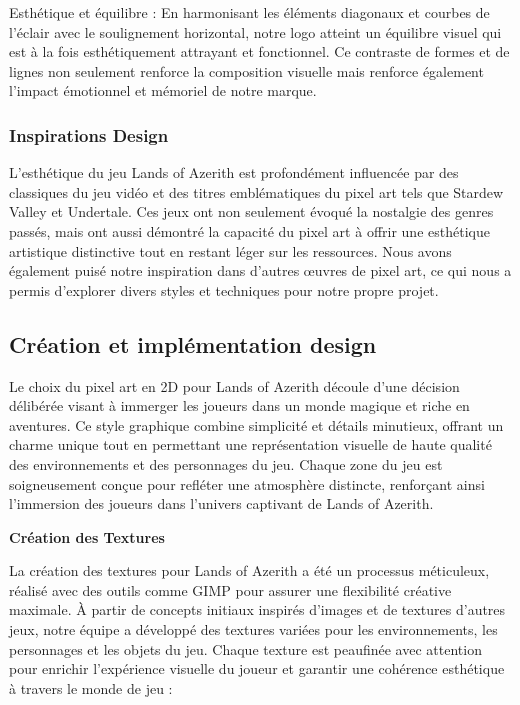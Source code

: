 Esthétique et équilibre : En harmonisant les éléments diagonaux et courbes de l'éclair avec le soulignement horizontal, notre logo atteint un équilibre visuel qui est à la fois esthétiquement attrayant et fonctionnel. Ce contraste de formes et de lignes non seulement renforce la composition visuelle mais renforce également l'impact émotionnel et mémoriel de notre marque. 


\subsubsection{Inspirations Design}

L'esthétique du jeu Lands of Azerith est profondément influencée par des classiques du jeu vidéo et des titres emblématiques du pixel art tels que Stardew Valley et Undertale. 
Ces jeux ont non seulement évoqué la nostalgie des genres passés, mais ont aussi démontré la capacité du pixel art à offrir une esthétique artistique distinctive tout en restant léger sur les ressources. 
Nous avons également puisé notre inspiration dans d'autres œuvres de pixel art, ce qui nous a permis d'explorer divers styles et techniques pour notre propre projet.

\subsection{Création et implémentation design}

Le choix du pixel art en 2D pour Lands of Azerith découle d'une décision délibérée visant à immerger les joueurs dans un monde magique et riche en aventures. Ce style graphique combine simplicité et détails minutieux, offrant un charme unique tout en permettant une représentation visuelle de haute qualité des environnements et des personnages du jeu. Chaque zone du jeu est soigneusement conçue pour refléter une atmosphère distincte, renforçant ainsi l'immersion des joueurs dans l'univers captivant de Lands of Azerith. 

\textbf{Création des Textures}

La création des textures pour Lands of Azerith a été un processus méticuleux, réalisé avec des outils comme GIMP pour assurer une flexibilité créative maximale. À partir de concepts initiaux inspirés d'images et de textures d'autres jeux, notre équipe a développé des textures variées pour les environnements, les personnages et les objets du jeu. Chaque texture est peaufinée avec attention pour enrichir l'expérience visuelle du joueur et garantir une cohérence esthétique à travers le monde de jeu : 

